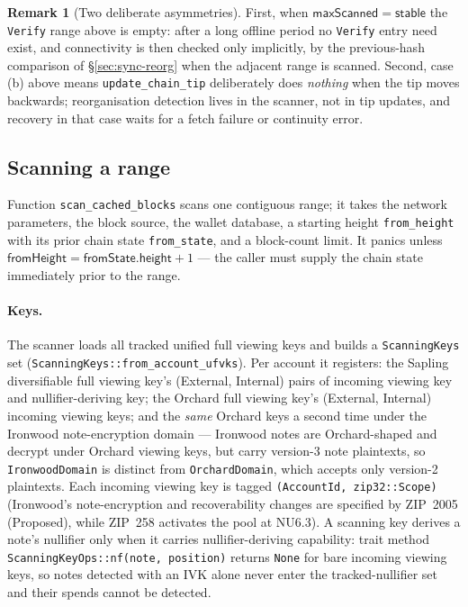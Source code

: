 \documentclass[11pt,a4paper]{article}
\theoremstyle{definition}
\newtheorem{remark}[theorem]{Remark}
\begin{document}
\begin{remark}[Two deliberate asymmetries]\label{rem:sync-tip-asymmetries}
First, when $\mathsf{maxScanned} = \mathsf{stable}$ the \texttt{Verify}
range above is empty: after a long offline period no \texttt{Verify} entry
need exist, and connectivity is then checked only implicitly, by the
previous-hash comparison of \S\ref{sec:sync-reorg} when the adjacent range
is scanned.
Second, case (b) above means \texttt{update\_chain\_tip} deliberately does
\emph{nothing} when the tip moves backwards; reorganisation detection lives
in the scanner, not in tip updates, and recovery in that case waits for a
fetch failure or continuity error.
\end{remark}

\subsection{Scanning a range}\label{sec:sync-scan}

Function \texttt{scan\_cached\_blocks} scans one contiguous range; it
takes the network parameters, the block source, the wallet database, a
starting height \texttt{from\_height} with its prior chain state
\texttt{from\_state}, and a block-count limit. It panics unless
$\mathsf{fromHeight} = \mathsf{fromState.height} + 1$ --- the caller must
supply the chain state immediately prior to the range.

\paragraph{Keys.} The scanner loads all tracked unified full viewing keys
and builds a \texttt{ScanningKeys} set
(\texttt{ScanningKeys::from\_account\_ufvks}). Per account it registers:
the Sapling diversifiable full viewing key's (External, Internal) pairs of
incoming viewing key and nullifier-deriving key; the Orchard full viewing
key's (External, Internal) incoming viewing keys; and the \emph{same}
Orchard keys a second time under the Ironwood note-encryption domain ---
Ironwood notes are Orchard-shaped and decrypt under Orchard viewing keys,
but carry version-3 note plaintexts, so \texttt{IronwoodDomain} is distinct
from \texttt{OrchardDomain}, which accepts only version-2 plaintexts. Each
incoming viewing key is tagged \texttt{(AccountId, zip32::Scope)}
(Ironwood's note-encryption and recoverability changes are specified by
ZIP~2005 (Proposed), while ZIP~258 activates the pool at NU6.3). A scanning
key derives a note's nullifier only when it carries nullifier-deriving
capability: trait method \texttt{ScanningKeyOps::nf(note, position)}
returns \texttt{None} for bare incoming viewing keys, so notes detected
with an IVK alone never enter the tracked-nullifier set and their spends
cannot be detected.
\end{document}
